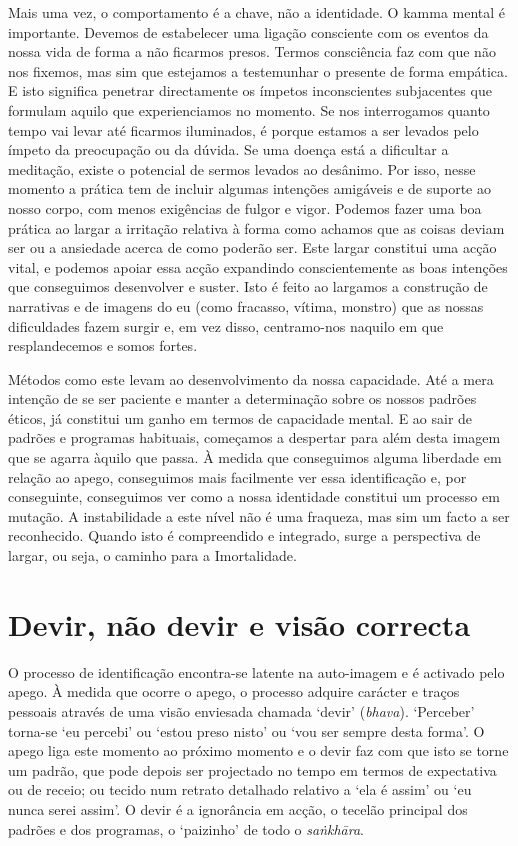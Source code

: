Mais uma vez, o comportamento é a chave, não a identidade. O kamma mental é importante. Devemos de estabelecer uma ligação consciente com os eventos da nossa vida de forma a não ficarmos presos. Termos consciência faz com que não nos fixemos, mas sim que estejamos a testemunhar o presente de forma empática. E isto significa penetrar directamente os ímpetos inconscientes subjacentes que formulam aquilo que experienciamos no momento. Se nos interrogamos quanto tempo vai levar até ficarmos iluminados, é porque estamos a ser levados pelo ímpeto da preocupação ou da dúvida. Se uma doença está a dificultar a meditação, existe o potencial de sermos levados ao desânimo. Por isso, nesse momento a prática tem de incluir algumas intenções amigáveis e de suporte ao nosso corpo, com menos exigências de fulgor e vigor. Podemos fazer uma boa prática ao largar a irritação relativa à forma como achamos que as coisas deviam ser ou a ansiedade acerca de como poderão ser. Este largar constitui uma acção vital, e podemos apoiar essa acção expandindo conscientemente as boas intenções que conseguimos desenvolver e suster. Isto é feito ao largamos a construção de narrativas e de imagens do eu (como fracasso, vítima, monstro) que as nossas dificuldades fazem surgir e, em vez disso, centramo-nos naquilo em que resplandecemos e somos fortes.

Métodos como este levam ao desenvolvimento da nossa capacidade. Até a mera intenção de se ser paciente e manter a determinação sobre os nossos padrões éticos, já constitui um ganho em termos de capacidade mental. E ao sair de padrões e programas habituais, começamos a despertar para além desta imagem que se agarra àquilo que passa. À medida que conseguimos alguma liberdade em relação ao apego, conseguimos mais facilmente ver essa identificação e, por conseguinte, conseguimos ver como a nossa identidade constitui um processo em mutação. A instabilidade a este nível não é uma fraqueza, mas sim um facto a ser reconhecido. Quando isto é compreendido e integrado, surge a perspectiva de largar, ou seja, o caminho para a Imortalidade.

\section{Devir, não devir e visão correcta}

O processo de identificação encontra-se latente na auto-imagem e é activado pelo apego. À medida que ocorre o apego, o processo adquire carácter e traços pessoais através de uma visão enviesada chamada `devir' (\emph{bhava}). `Perceber' torna-se `eu percebi' ou `estou preso nisto' ou `vou ser sempre desta forma'. O apego liga este momento ao próximo momento e o devir faz com que isto se torne um padrão, que pode depois ser projectado no tempo em termos de expectativa ou de receio; ou tecido num retrato detalhado relativo a `ela é assim' ou `eu nunca serei assim'. O devir é a ignorância em acção, o tecelão principal dos padrões e dos programas, o `paizinho' de todo o \emph{saṅkhāra}.

